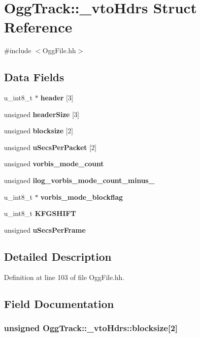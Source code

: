 \section{Ogg\+Track\+:\+:\+\_\+vto\+Hdrs Struct Reference}
\label{structOggTrack_1_1__vtoHdrs}


{\ttfamily \#include $<$Ogg\+File.\+hh$>$}

\subsection*{Data Fields}
\begin{DoxyCompactItemize}
\item 
u\+\_\+int8\+\_\+t $\ast$ {\bf header} [3]
\item 
unsigned {\bf header\+Size} [3]
\item 
unsigned {\bf blocksize} [2]
\item 
unsigned {\bf u\+Secs\+Per\+Packet} [2]
\item 
unsigned {\bf vorbis\+\_\+mode\+\_\+count}
\item 
unsigned {\bf ilog\+\_\+vorbis\+\_\+mode\+\_\+count\+\_\+minus\+\_}
\item 
u\+\_\+int8\+\_\+t $\ast$ {\bf vorbis\+\_\+mode\+\_\+blockflag}
\item 
u\+\_\+int8\+\_\+t {\bf K\+F\+G\+S\+H\+I\+F\+T}
\item 
unsigned {\bf u\+Secs\+Per\+Frame}
\end{DoxyCompactItemize}


\subsection{Detailed Description}


Definition at line 103 of file Ogg\+File.\+hh.



\subsection{Field Documentation}
\subsubsection[{blocksize}]{\setlength{\rightskip}{0pt plus 5cm}unsigned Ogg\+Track\+::\+\_\+vto\+Hdrs\+::blocksize[2]}\label{structOggTrack_1_1__vtoHdrs_a093c197b3d70e614db4918e95366c093}


